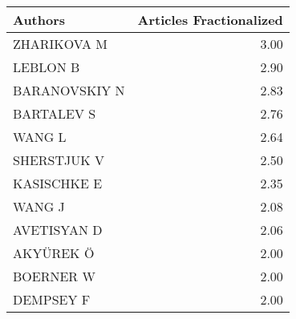 
\begin{tabular}{lr}
\toprule
Authors & Articles Fractionalized\\
\midrule
ZHARIKOVA M & 3.00\\
LEBLON B & 2.90\\
BARANOVSKIY N & 2.83\\
BARTALEV S & 2.76\\
WANG L & 2.64\\
\addlinespace
SHERSTJUK V & 2.50\\
KASISCHKE E & 2.35\\
WANG J & 2.08\\
AVETISYAN D & 2.06\\
AKYÜREK Ö & 2.00\\
\addlinespace
BOERNER W & 2.00\\
DEMPSEY F & 2.00\\
\bottomrule
\end{tabular}